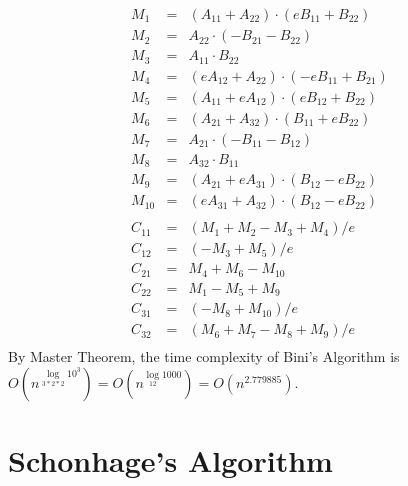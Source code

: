 \documentclass{article}
\begin{document}
\begin{eqnarray*}
M_1 &=& (A_{11} + A_{22}) \cdot (eB_{11} + B_{22}) \\
M_2 &=& A_{22}\cdot  (-B_{21} - B_{22}) \\
M_3 &=& A_{11}\cdot B_{22} \\
M_4 &=& (eA_{12} + A_{22})\cdot (-eB_{11} + B_{21}) \\
M_5 &=& (A_{11} + eA_{12}) \cdot (eB_{12} + B_{22}) \\
M_6 &=& (A_{21} + A_{32}) \cdot (B_{11} + eB_{22}) \\
M_7 &=& A_{21} \cdot (-B_{11} - B_{12}) \\
M_8 &=& A_{32} \cdot B_{11}\\
M_9 &=& (A_{21} + eA_{31}) \cdot (B_{12} - eB_{22})\\
M_{10} &=& (eA_{31} + A_{32}) \cdot (B_{12} - eB_{22})\\\\
C_{11} &=& (M_1 + M_2 - M_3 + M_4)/e \\
C_{12} &=& (-M_3 + M_5)/e \\
C_{21} &=& M_4 + M_6 - M_{10}\\
C_{22} &=& M_1 - M_5 + M_9\\
C_{31} &=& (-M_8 + M_{10})/e \\
C_{32} &=& (M_6 + M_7 - M_8 + M_9)/e\\
\end{eqnarray*}
By Master Theorem, the time complexity of Bini's Algorithm is $O(n^{\log\limits_{3*2*2}10^3}) = O(n^{\log\limits_{12}1000}) = O(n^{2.779885})$.
\section{Schonhage's Algorithm}
\end{document}

